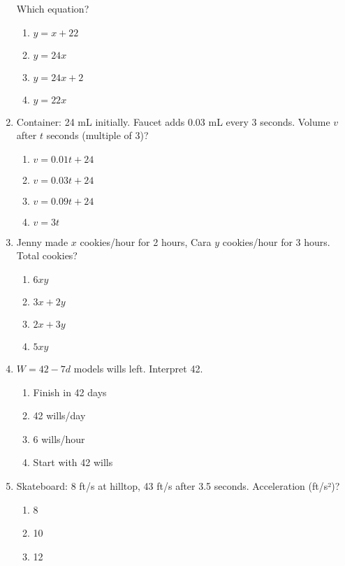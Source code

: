 \documentclass[12pt]{exam}
\begin{document}
\begin{enumerate}
\begin{center}
\begin{tabular}{|c|c|}
            \hline
        \end{tabular}
    \end{center}
    Which equation?
    \begin{enumerate}[label=\Alph*)]
        \item $y = x + 22$
        \item $y = 24x$
        \item $y = 24x + 2$
        \item $y = 22x$
    \end{enumerate}
    \item Container: 24 mL initially. Faucet adds 0.03 mL every 3 seconds. Volume $v$ after $t$ seconds (multiple of 3)?
    \begin{enumerate}[label=\Alph*)]
        \item $v = 0.01t + 24$
        \item $v = 0.03t + 24$
        \item $v = 0.09t + 24$
        \item $v = 3t$
    \end{enumerate}
    \item Jenny made $x$ cookies/hour for 2 hours, Cara $y$ cookies/hour for 3 hours. Total cookies?
    \begin{enumerate}[label=\Alph*)]
        \item $6xy$
        \item $3x + 2y$
        \item $2x + 3y$
        \item $5xy$
    \end{enumerate}
    \item $W = 42 - 7d$ models wills left. Interpret 42.
    \begin{enumerate}[label=\Alph*)]
        \item Finish in 42 days
        \item 42 wills/day
        \item 6 wills/hour
        \item Start with 42 wills
    \end{enumerate}
    \item Skateboard: 8 ft/s at hilltop, 43 ft/s after 3.5 seconds. Acceleration (ft/s²)?
    \begin{enumerate}[label=\Alph*)]
        \item 8
        \item 10
        \item 12

\end{enumerate}
\end{enumerate}
\end{document}
